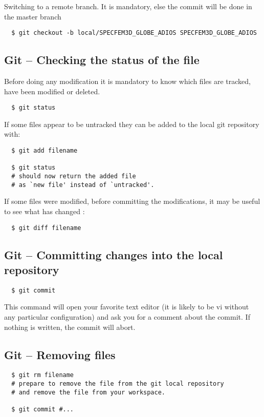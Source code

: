 \documentclass[11pt,twoside]{article}
\begin{document}
Switching to a remote branch. It is mandatory, else the commit will be done in the master branch
\begin{verbatim}
  $ git checkout -b local/SPECFEM3D_GLOBE_ADIOS SPECFEM3D_GLOBE_ADIOS
\end{verbatim}

\subsection*{Git -- Checking the status of the file}
Before doing any modification it is mandatory to know which files are tracked, have been modified or deleted.

\begin{verbatim}
  $ git status
\end{verbatim}

If some files appear to be untracked they can be added to the local git repository with:

\begin{verbatim}
  $ git add filename

  $ git status
  # should now return the added file
  # as `new file' instead of `untracked'.
\end{verbatim}

If some files were modified, before committing the modifications, it may be useful to see what has changed :

\begin{verbatim}
  $ git diff filename
\end{verbatim}

\subsection*{Git -- Committing changes into the local repository}

\begin{verbatim}
  $ git commit
\end{verbatim}

This command will open your favorite text editor (it is likely to be vi without any particular configuration) and ask you for a comment about the commit. If nothing is written, the commit will abort.

\subsection*{Git -- Removing files}

\begin{verbatim}
  $ git rm filename
  # prepare to remove the file from the git local repository
  # and remove the file from your workspace.

  $ git commit #...
\end{verbatim}
\end{document}
